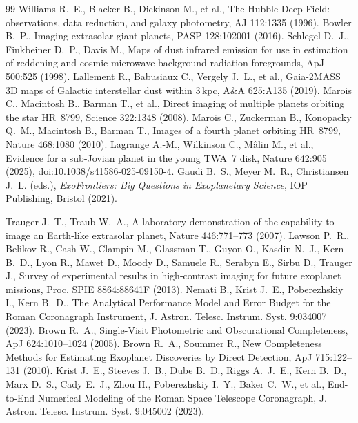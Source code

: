 \begin{thebibliography}{99}
 Williams R.~E., Blacker B., Dickinson M., et al., The Hubble Deep Field: observations, data reduction, and galaxy photometry, AJ 112:1335 (1996).
 Bowler B.~P., Imaging extrasolar giant planets, PASP 128:102001 (2016).
 Schlegel D.~J., Finkbeiner D.~P., Davis M., Maps of dust infrared emission for use in estimation of reddening and cosmic microwave background radiation foregrounds, ApJ 500:525 (1998).
 Lallement R., Babusiaux C., Vergely J.~L., et al., Gaia-2MASS 3D maps of Galactic interstellar dust within 3\,kpc, A\&A 625:A135 (2019).
 Marois C., Macintosh B., Barman T., et al., Direct imaging of multiple planets orbiting the star HR~8799, Science 322:1348 (2008).
 Marois C., Zuckerman B., Konopacky Q.~M., Macintosh B., Barman T., Images of a fourth planet orbiting HR~8799, Nature 468:1080 (2010).
 Lagrange A.-M., Wilkinson C., M\^{a}lin M., et al., Evidence for a sub-Jovian planet in the young TWA~7 disk, Nature 642:905 (2025), doi:10.1038/s41586-025-09150-4.
 Gaudi B.~S., Meyer M.~R., Christiansen J.~L. (eds.), \emph{ExoFrontiers: Big Questions in Exoplanetary Science}, IOP Publishing, Bristol (2021).

Trauger J.~T., Traub W.~A.,
A laboratory demonstration of the capability to image an Earth-like extrasolar planet,
Nature 446:771--773 (2007).
Lawson P.~R., Belikov R., Cash W., Clampin M., Glassman T.,
Guyon O., Kasdin N.~J., Kern B.~D., Lyon R., Mawet D.,
Moody D., Samuele R., Serabyn E., Sirbu D., Trauger J.,
Survey of experimental results in high-contrast imaging for future exoplanet missions,
Proc. SPIE 8864:88641F (2013).
Nemati B., Krist J.~E., Poberezhskiy I., Kern B.~D.,
The Analytical Performance Model and Error Budget for the Roman Coronagraph Instrument,
J. Astron. Telesc. Instrum. Syst. 9:034007 (2023).
Brown R.~A.,
Single-Visit Photometric and Obscurational Completeness,
ApJ 624:1010--1024 (2005).
Brown R.~A., Soummer R.,
New Completeness Methods for Estimating Exoplanet Discoveries by Direct Detection,
ApJ 715:122--131 (2010).
Krist J.~E., Steeves J.~B., Dube B.~D., Riggs A.~J.~E.,
Kern B.~D., Marx D.~S., Cady E.~J., Zhou H.,
Poberezhskiy I.~Y., Baker C.~W., et al.,
End-to-End Numerical Modeling of the Roman Space Telescope Coronagraph,
J. Astron. Telesc. Instrum. Syst. 9:045002 (2023).



\end{thebibliography}
